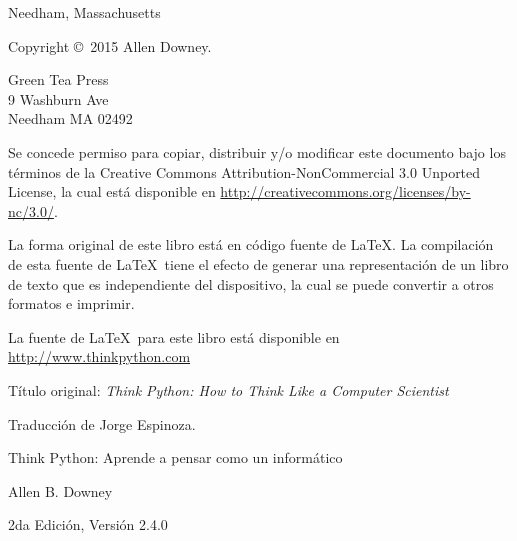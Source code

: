 \documentclass[10pt]{book}
\newcommand{\thetitle}{Think Python: Aprende a pensar como un informático}
\newcommand{\theversion}{2da Edición, Versión 2.4.0}
\newcommand{\thedate}{}
\begin{document}
\begin{latexonly}
\begin{flushright}
{\small Needham, Massachusetts}

\vfill

\end{flushright}


\pagebreak
\thispagestyle{empty}

{\small
Copyright \copyright ~2015 Allen Downey.


\vspace{0.2in}

\begin{flushleft}
Green Tea Press       \\
9 Washburn Ave        \\
Needham MA 02492
\end{flushleft}

Se concede permiso para copiar, distribuir y/o modificar este documento
bajo los términos de la Creative Commons Attribution-NonCommercial
3.0 Unported License, la cual está disponible en \url{http://creativecommons.org/licenses/by-nc/3.0/}.

La forma original de este libro está en código fuente de \LaTeX.  La compilación
de esta fuente de \LaTeX\ tiene el efecto de generar una representación de un libro
de texto que es independiente del dispositivo, la cual se puede convertir a otros formatos
e imprimir.

La fuente de \LaTeX\ para este libro está disponible en
\url{http://www.thinkpython.com}

Título original: {\em Think Python: How to Think Like a Computer Scientist}

Traducción de Jorge Espinoza.

\vspace{0.2in}

} %

\end{latexonly}



\begin{htmlonly}


{\Large \thetitle}

{\large Allen B. Downey}

\theversion

\thedate

\setcounter{chapter}{-1}

\end{htmlonly}
\end{document}
